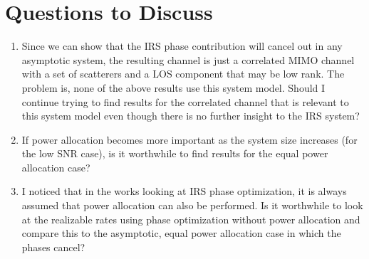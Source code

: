 \documentclass[12pt,a4paper]{report}
\begin{document}
\section{Questions to Discuss }
\begin{enumerate}
\item
Since we can show that the IRS phase contribution will cancel out in any asymptotic system, the resulting channel is just a correlated MIMO channel with a set of scatterers and a LOS component that may be low rank. The problem is, none of the above results use this system model. Should I continue trying to find results for the correlated channel that is relevant to this system model even though there is no further insight to the IRS system?
\item
If power allocation becomes more important as the system size increases (for the low SNR case), is it worthwhile to find results for the equal power allocation case? 
\item
I noticed that in the works looking at IRS phase optimization, it is always assumed that power allocation can also be performed. Is it worthwhile to look at the realizable rates using phase optimization without power allocation and compare this to the asymptotic, equal power allocation case in which the phases cancel?
\end{enumerate}

\end{document}
